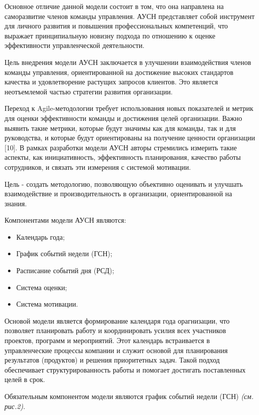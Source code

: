 Основное отличие данной модели состоит в том, что она направлена на
саморазвитие членов команды управления. АУСН представляет собой
инструмент для личного развития и повышения профессиональных
компетенций, что выражает принципиальную новизну подхода по отношению к
оценке эффективности управленческой деятельности.

Цель внедрения модели АУСН заключается в улучшении взаимодействия членов
команды управления, ориентированной на достижение высоких стандартов
качества и удовлетворение растущих запросов клиентов. Это является
неотъемлемой частью стратегии развития организации.

Переход к Agile-методологии требует использования новых показателей и
метрик для оценки эффективности команды и достижения целей организации.
Важно выявить такие метрики, которые будут значимы как для команды, так
и для руководства, и которые будут ориентированы на получение ценности
организации {[}10{]}. В рамках разработки модели АУСН авторы стремились
измерить такие аспекты, как инициативность, эффективность планирования,
качество работы сотрудников, и связать эти измерения с системой
мотивации.

Цель - создать методологию, позволяющую объективно оценивать и улучшать
взаимодействие и производительность в организации, ориентированной на
знания.

Компонентами модели АУСН являются:

\begin{itemize}
\item
  Календарь года;
\item
  График событий недели (ГСН);
\item
  Расписание событий дня (РСД);
\item
  Система оценки;
\item
  Система мотивации.
\end{itemize}

Основой модели является формирование календаря года орагнизации, что
позволяет планировать работу и координировать усилия всех участников
проектов, программ и мероприятий. Этот календарь встраивается в
управленческие процессы компании и служит основой для планирования
результатов (продуктов) и решения приоритетных задач. Такой подход
обеспечивает структурированность работы и помогает достигать
поставленных целей в срок.

Обязательным компонентом модели являются график событий недели (ГСН)
\emph{(см. рис.2)}.


